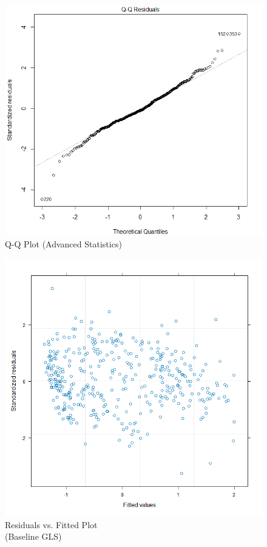 \documentclass[10pt]{article}
\begin{document}
{{{{\begin{figure}[tph]
\centering
	\includegraphics[width=0.9\columnwidth]{model_ols_adv_qq_resid_sq_adj}
	\caption[]
    	{Q-Q Plot (Advanced Statistics)\endtabular}
	\label{advanced-qq}
\end{figure}

\begin{figure}[tph]
\centering
	\includegraphics[width=0.9\columnwidth]{model_gls_base_resid_vs_fitted_sq}
	\caption[]
    	{Residuals vs. Fitted Plot\\(Baseline GLS)\endtabular}
	\label{baseline-gls-residuals}
\end{figure}

}}}}
\end{document}
